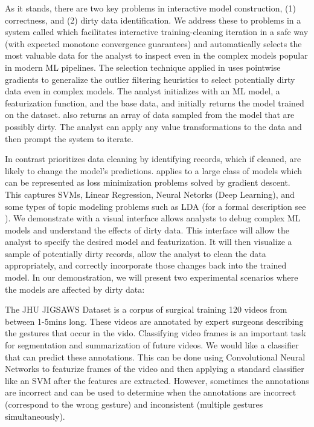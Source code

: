 As it stands, there are two key problems in interactive model construction, (1) correctness, and (2) dirty data identification.
We address these to problems in a system called \sys which facilitates interactive training-cleaning iteration in a safe way (with expected monotone convergence guarantees) and automatically selects the most valuable data for the analyst to inspect even in the complex models popular in modern ML pipelines.
The selection technique applied in \sys uses pointwise gradients to generalize the outlier filtering heuristics to select potentially dirty data even in complex models. 
The analyst initializes \sys with an ML model, a featurization function, and the base data, and \sys initially returns the model trained on the dataset.
\sys also returns an array of data sampled from the model that are possibly dirty.
The analyst can apply any value transformations to the data and then prompt the system to iterate. 

In contrast  \sys prioritizes data cleaning by identifying records, which if cleaned, are likely to change the model's predictions.
\sys applies to a large class of models which can be represented as loss minimization problems solved by gradient descent.
This captures SVMs, Linear Regression, Neural Netorks (Deep Learning), and some types of topic modeling problems such as LDA (for a formal description see \cite{activecleanarxiv}).
We demonstrate \sys with a visual interface allows analysts to debug complex ML models and understand the effects of dirty data.
This interface will allow the analyst to specify the desired model and featurization.
It will then visualize a sample of potentially dirty records, allow the analyst to clean the data appropriately, and correctly incorporate those changes back into the trained model.  
In our demonstration, we will present two experimental scenarios where the models are affected by dirty data: 

\begin{example}\sloppy
The JHU JIGSAWS Dataset is a corpus of surgical training 120 videos from between 1-5mins long.
These videos are annotated by expert surgeons describing the gestures that occur in the vido. 
Classifying video frames is an important task for segmentation and summarization of future videos.
We would like a classifier that can predict these annotations.
This can be done using Convolutional Neural Networks to featurize frames of the video and then applying a standard classifier like an SVM after the features are extracted.
However, sometimes the annotations are incorrect and \sys can be used to determine when the annotations are incorrect (correspond to the wrong gesture) and inconsistent (multiple gestures simultaneously).
\end{example}

